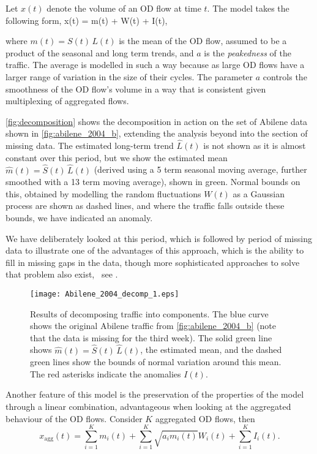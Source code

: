 Let $x(t)$ denote the volume of an OD flow at time $t$. The model
takes the following form, 
\be 
  x(t) = m(t) +  W(t) + I(t),
  \label{eq:temporal_model}
\ee 

\noindent where $m(t) = S(t)\,L(t)$ is the mean of the OD flow,
assumed to be a product of the seasonal and long term trends, and $a$
is the \emph{peakedness} of the traffic. The average is modelled in
such a way because as large OD flows have a larger range of variation
in the size of their cycles. The parameter $a$ controls the smoothness
of the OD flow's volume in a way that is consistent given multiplexing
of aggregated flows.

\autoref{fig:decomposition} shows the decomposition in action on the
set of Abilene data shown in \autoref{fig:abilene_2004_b}, extending
the analysis beyond into the section of missing data. The estimated
long-term trend $\hat{L}(t)$ is not shown as it is almost constant
over this period, but we show the estimated mean $\hat{m}(t)=
\hat{S}(t)\, \hat{L}(t)$ (derived using a 5 term seasonal moving
average, further smoothed with a 13 term moving average), shown in
green. Normal bounds on this, obtained by modelling the random
fluctuations $W(t)$ as a Gaussian process are shown as dashed lines,
and where the traffic falls outside these bounds, we have indicated an
anomaly. 

We have deliberately looked at this period, which is followed by
period of missing data to illustrate one of the advantages of this
approach, which is the ability to fill in missing gaps in the data,
though more sophisticated approaches to solve that problem also
exist, \eg~see \cite{Zhang09TMCS}.
 
\begin{figure}[htp]
  \begin{center}
    \texttt{[image: Abilene\_2004\_decomp\_1.eps]}
    \caption{Results of decomposing traffic into components. The blue
      curve shows the original Abilene traffic from
      \autoref{fig:abilene_2004_b} (note that the data is missing for
      the third week). The solid green line shows $\hat{m}(t)=
      \hat{S}(t)\, \hat{L}(t)$, the estimated  mean, and the dashed
      green lines show the bounds of normal variation around this
      mean. The red asterisks indicate the anomalies $I(t)$.
      \label{fig:decomposition}}
  \end{center}
\end{figure}

Another feature of this model is the preservation of the properties of the
model through a linear combination, advantageous when looking at the
aggregated behaviour of the OD flows. Consider $K$ aggregated OD
flows, then 
\[
  x_{\text{agg}}(t) = \sum_{i=1}^K m_i(t) + \sum_{i=1}^K \sqrt{a_i m_i(t)} W_i(t) + \sum_{i=1}^K I_i(t). 
\]

